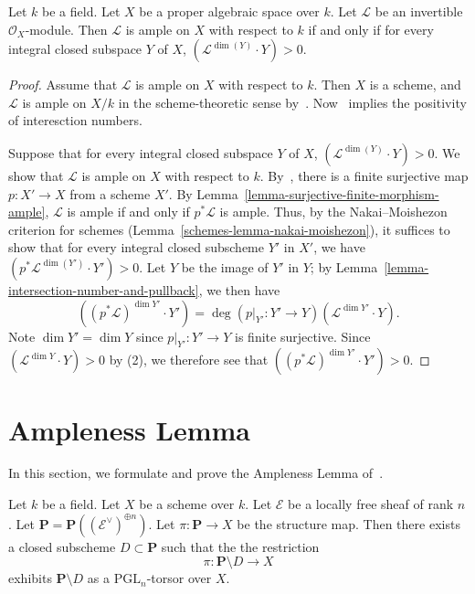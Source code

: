 \begin{lemma}
\label{spaces-lemma-nakai-moishezon}
Let $k$ be a field.
Let $X$ be a proper algebraic space over $k$.
Let $\mathcal{L}$ be an invertible $\mathcal{O}_X$-module.
Then $\mathcal{L}$ is ample on $X$ with respect to $k$ if and only if
for every integral closed subspace $Y$ of $X$,
$(\mathcal{L}^{\dim(Y)} \cdot Y) > 0$.
\end{lemma}
\begin{proof}
  Assume that $\mathcal{L}$ is ample on $X$ with respect to $k$.
  Then $X$ is a scheme, and $\mathcal{L}$ is ample on $X/k$ in the
  scheme-theoretic sense by~.
  Now~ implies the positivity of interesction numbers.

  Suppose that for every integral closed subspace $Y$ of $X$,
  $(\mathcal{L}^{\dim(Y)} \cdot Y) > 0$.
  We show that $\mathcal{L}$ is ample on $X$ with respect to $k$.
  By~, there is a finite surjective map $p : X' \to X$ from a
  scheme $X'$.
  By Lemma~\ref{lemma-surjective-finite-morphism-ample}, $\mathcal{L}$ is
  ample if and only if $p^*\mathcal{L}$ is ample.
  Thus, by the Nakai--Moishezon criterion for schemes
  (Lemma~\ref{schemes-lemma-nakai-moishezon}),
  it suffices to show that for every integral closed subscheme $Y'$ in $X'$, we
  have $(p^*\mathcal{L}^{\dim(Y')} \cdot Y') > 0$.
  Let $Y$ be the image of $Y'$ in $Y$;
  by Lemma~\ref{lemma-intersection-number-and-pullback}, we then have
  $$
  ( (p^*\mathcal{L})^{\dim Y'} \cdot Y') = \deg(p\rvert_{Y'} : Y' \to
  Y)(\mathcal{L}^{\dim Y'} \cdot Y).
  $$
  Note $\dim Y' = \dim Y$ since $p\rvert_{Y'} : Y' \to Y$ is finite surjective.
  Since $(\mathcal{L}^{\dim Y} \cdot Y) > 0$ by (2), we therefore see that
  $( (p^*\mathcal{L})^{\dim Y'} \cdot Y') > 0$.
\end{proof}

\section{Ampleness Lemma}
In this section, we formulate and prove the Ampleness Lemma
of~\cite[Lemmas 3.9 and 3.13]{ko90}.

\begin{lemma}
\label{lemma-pgl-bundle-from-loc-free}
Let $k$ be a field.
Let $X$ be a scheme over $k$.
Let $\mathcal{E}$ be a locally free sheaf of rank $n$.
Let $\mathbf{P} = \mathbf{P}((\mathcal{E}^\vee)^{\oplus n})$.
Let $\pi : \mathbf{P} \to X$ be the structure map.
Then there exists a closed subscheme $D \subset \mathbf{P}$ such that the
the restriction
$$
\pi : \mathbf{P} \setminus D \to X
$$
exhibits $\mathbf{P} \setminus D$ as a $\mathrm{PGL}_n$-torsor over $X$.
\end{lemma}

